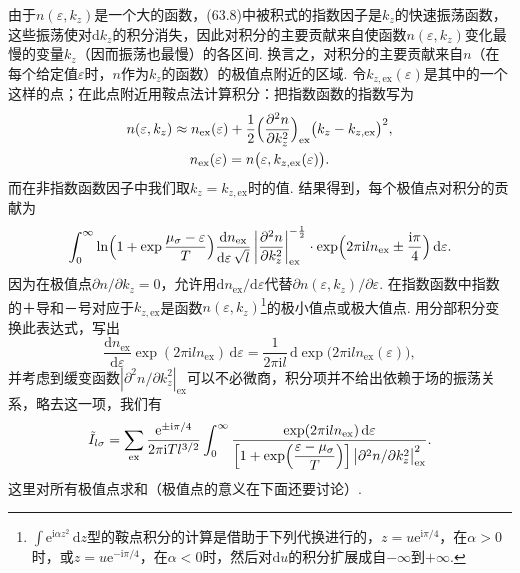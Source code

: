 由于$n(\varepsilon,k_z)$是一个大的函数，(63.8)中被积式的指数因子是$k_z$的快速振荡函数，这些振荡使对$\mathrm{d}k_z$的积分消失，因此对积分的主要贡献来自使函数$n(\varepsilon,k_z)$变化最慢的变量$k_z$（因而振荡也最慢）的各区间. 换言之，对积分的主要贡献来自$n$（在每个给定值$\varepsilon$时，$n$作为$k_z$的函数）的极值点附近的区域. 令$k_{z,\mathrm{ex}}(\varepsilon)$是其中的一个这样的点；在此点附近用鞍点法计算积分：把指数函数的指数写为
\begin{equation*}
\begin{gathered}
n(\varepsilon,k_z)\approx n_{\mathrm{ex}}(\varepsilon)
+\frac{1}{2}\Bigl(\frac{\partial^2 n}{\partial k_z^2}\Bigr)_{\mathrm{ex}}
\bigl(k_z-k_{z,\mathrm{ex}}\bigr)^2,\\
n_{\mathrm{ex}}(\varepsilon)=n\bigl(\varepsilon,k_{z,\mathrm{ex}}(\varepsilon)\bigr).
\end{gathered}
\end{equation*}
而在非指数函数因子中我们取$k_z=k_{z,\mathrm{ex}}$时的值. 结果得到，每个极值点对积分的贡献为
\begin{equation*}
\int_0^{\infty}\ln\Bigl(1+\exp\frac{\mu_\sigma-\varepsilon}{T}\Bigr)
\frac{\mathrm{d}n_{\mathrm{ex}}}{\mathrm{d}\varepsilon\,\sqrt{l}}\,
\biggl|\frac{\partial^2 n}{\partial k_z^2}\biggr|_{\mathrm{ex}}^{-\frac{1}{2}}
\cdot\exp\Bigl(2\pi\mathrm{i}ln_{\mathrm{ex}}\pm\frac{\mathrm{i}\pi}{4}\Bigr)
\,\mathrm{d}\varepsilon.
\end{equation*}
因为在极值点$\partial n/\partial k_z=0$，允许用$\mathrm{d}n_{\mathrm{ex}}/\mathrm{d}\varepsilon$代替$\partial n(\varepsilon,k_z)/\partial\varepsilon$. 在指数函数中指数的＋导和－号对应于$k_{z,\mathrm{ex}}$是函数$n(\varepsilon,k_z)$\footnote{$\int\mathrm e^{\mathrm i\alpha z^2}\,\mathrm dz$型的鞍点积分的计算是借助于下列代换进行的，$z=u\mathrm e^{\mathrm i\pi/4}$，在$\alpha>0$时，或$z=u\mathrm e^{-\mathrm i\pi/4}$，在$\alpha<0$时，然后对$\mathrm du$的积分扩展成自$-\infty$到$+\infty$.}的极小值点或极大值点. 用分部积分变换此表达式，写出
\begin{equation*}
\frac{\mathrm{d}n_{\mathrm{ex}}}{\mathrm{d}\varepsilon}
\exp(2\pi\mathrm{i}ln_{\mathrm{ex}})\,\mathrm{d}\varepsilon
=\frac{1}{2\pi\mathrm{i}l}\,
\mathrm{d}\exp\bigl(2\pi\mathrm{i}ln_{\mathrm{ex}}(\varepsilon)\bigr),
\end{equation*}
并考虑到缓变函数$|\partial^2 n/\partial k_z^2|_{\mathrm{ex}}$可以不必微商，积分项并不给出依赖于场的振荡关系，略去这一项，我们有
\begin{equation}
\tilde{I}_{l\sigma}=\sum_{\mathrm{ex}}\frac{\mathrm{e}^{\pm\mathrm{i}\pi/4}}
{2\pi\mathrm{i}Tl^{3/2}}\int_0^{\infty}
\frac{\exp(2\pi\mathrm{i}ln_{\mathrm{ex}})\,\mathrm{d}\varepsilon}
{\Bigl[1+\exp\Bigl(\dfrac{\varepsilon-\mu_\sigma}{T}\Bigr)\Bigr]
\,\bigl|\partial^2 n/\partial k_z^2\bigr|_{\mathrm{ex}}^{2}}.
\end{equation}
这里对所有极值点求和（极值点的意义在下面还要讨论）.

